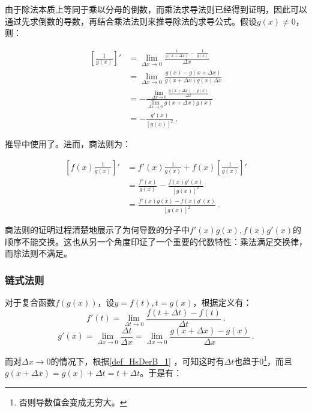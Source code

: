 由于除法本质上等同于乘以分母的倒数，而乘法求导法则已经得到证明，因此可以通过先求倒数的导数，再结合乘法法则来推导除法的求导公式。假设$g(x)\neq0$，则：

\begin{equation}
\begin{split}
\left[\frac{1}{g(x)}\right]'&=\lim_{\Delta x\to 0}\frac{\displaystyle\frac{1}{g(x+\Delta x)}-\frac{1}{g(x)}}{\Delta x}\\
&=\lim_{\Delta x\to 0}\frac{g(x)-g(x+\Delta x)}{g(x+\Delta x)g(x)\Delta x}\\
&=-\frac{\displaystyle\lim_{\Delta x\to 0}\frac{g(x+\Delta x)-g(x)}{\Delta x}}{\displaystyle\lim_{\Delta x\to 0}g(x+\Delta x)g(x)}\\
&=-\frac{g'(x)}{[g(x)]^2}~.
\end{split}
\end{equation}

推导中使用了。进而，商法则为：

\begin{equation}
\begin{split}
\left[f(x) \frac{1}{g(x)}\right]'&=f'(x)\frac{1}{g(x)}+f(x) [\frac{1}{g(x)}]'\\
&=\frac{f'(x)}{g(x)}-\frac{f(x)g'(x)}{[g(x)]^2}\\
&=\frac{f'(x)g(x)-f(x)g'(x)}{[g(x)]^2}~.
\end{split}
\end{equation}

商法则的证明过程清楚地展示了为何导数的分子中$f'(x)g(x),f(x)g'(x)$的顺序不能交换。这也从另一个角度印证了一个重要的代数特性：乘法满足交换律，而除法则不满足。

\subsubsection{链式法则}

对于复合函数$f\left(g(x)\right)$，设$y=f(t),t=g(x)$，根据定义有：
\begin{equation}
f'(t)=\lim_{\Delta t\to 0}\frac{f(t+\Delta t)-f(t)}{\Delta t}~.
\end{equation}
\begin{equation}
g'(x)=\lim_{\Delta x\to 0}\frac{\Delta t}{\Delta x}=\lim_{\Delta x\to 0}\frac{g(x+\Delta x)-g(x)}{\Delta x}~.
\end{equation}

而对$\Delta x\to 0$的情况下，根据\autoref{def_HsDerB_1} ，可知这时有$\Delta t$也趋于0\footnote{否则导数值会变成无穷大。}，而且$g(x+\Delta x)=g(x)+\Delta t=t+\Delta t$。于是有：

